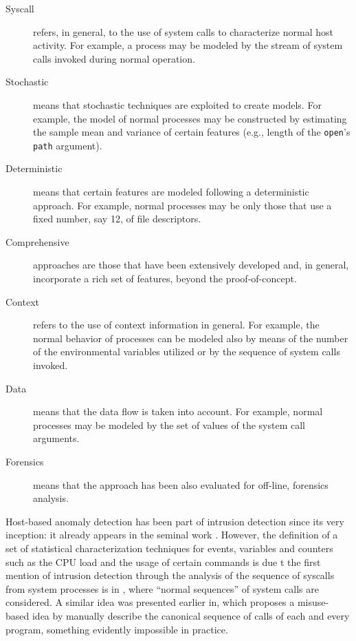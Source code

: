 \documentclass[12pt]{article}
\theoremstyle{definition}
\begin{document}
			\begin{description}
				\item[Syscall] refers, in general, to the use of system calls to
				characterize normal host activity. For example, a process may be
				modeled by the stream of system calls invoked during normal operation.
				\item[Stochastic] means that stochastic techniques are exploited to
				create models. For example, the model of normal processes may be
				constructed by estimating the sample mean and variance of certain
				features (e.g., length of the \texttt{open}'s \texttt{path} argument).
				\item[Deterministic] means that certain features are modeled following
				a deterministic approach. For example, normal processes may be only
				those that use a fixed number, say 12, of file descriptors.
				\item[Comprehensive] approaches are those that have been extensively
				developed and, in general, incorporate a rich set of features, beyond
				the proof-of-concept.
				\item[Context] refers to the use of context information in
				general. For example, the normal behavior of processes can be modeled
				also by means of the number of the environmental variables utilized or
				by the sequence of system calls invoked.
				\item[Data] means that the data flow is taken into account. For
				example, normal processes may be modeled by the set of values of the
				system call arguments.
				\item[Forensics] means that the approach has been also evaluated for
				off-line, forensics analysis.
			\end{description}
			
			
			Host-based anomaly detection has been part of intrusion detection
			since its very inception: it already appears in the seminal
			work \cite{Srinivasu2012}. However, the definition of a set of statistical
			characterization techniques for events, variables and counters such as
			the CPU load and the usage of certain commands is due
			t the first mention of intrusion
			detection through the analysis of the sequence of syscalls from system
			processes is in \citealp{Chianese2017}, where ``normal sequences'' of system
			calls are considered. A similar idea was presented earlier in, which proposes a misuse-based
			idea by manually describe the canonical sequence of calls of each and every program, something evidently impossible in practice.
			
\end{document}
